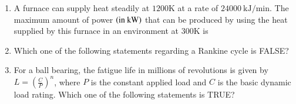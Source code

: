 \documentclass[journal]{IEEEtran}
\begin{document}
\begin{enumerate}[leftmargin=0pt]
\item
A furnace can supply heat steadily at $1200\text{K}$ at a rate of $24000~\text{kJ/min}$. The maximum amount of power $\left(\text{in kW}\right)$ that can be produced by using the heat supplied by this furnace in an environment at $300\text{K}$ is

\vspace{2mm}

\begin{enumerate}
\end{enumerate}

\hfill{}

\vspace{4mm}

\item
Which one of the following statements regarding a Rankine cycle is FALSE?

\vspace{2mm}

\begin{enumerate}
\end{enumerate}

\hfill{}

\vspace{4mm}

\item
For a ball bearing, the fatigue life in millions of revolutions is given by $L = \left(\frac{C}{P}\right)^n$, where $P$ is the constant applied load and $C$ is the basic dynamic load rating. Which one of the following statements is TRUE?

\vspace{2mm}


\end{enumerate}
\end{document}
